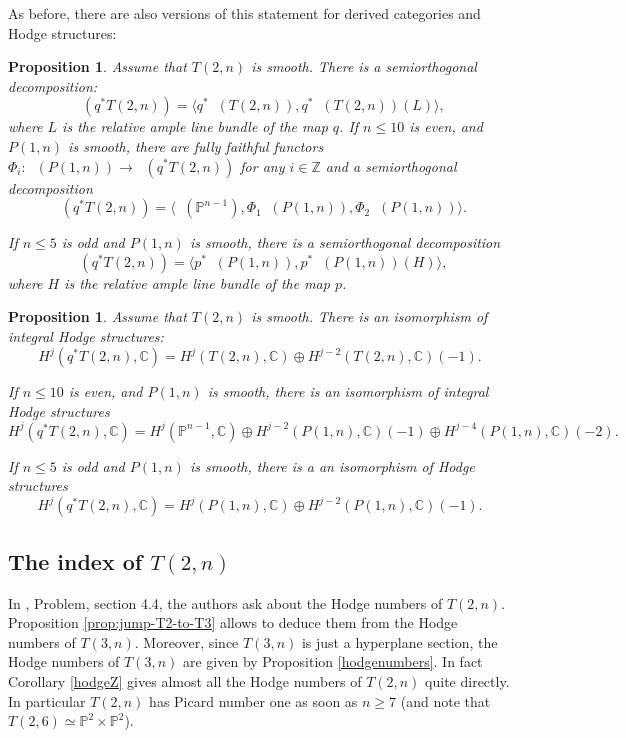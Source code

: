 \documentclass[11pt]{article}
\theoremstyle{plain}
\newtheorem{prop}[theorem]{Proposition}
\theoremstyle{definition}
\newcommand{\cat}[1]{\mathsf{#1}}
\newcommand{\sod}[1]{\langle #1 \rangle}
\DeclareMathOperator{\Db}{{\cat{D}^{\mathrm{b}}}}
\newcommand{\ZZ}{\mathbb{Z}}
\newcommand{\CC}{\mathbb{C}}
\newcommand{\PP}{\mathbb{P}}
\begin{document}
As before, there are also versions of this statement for derived categories and Hodge structures:

\begin{prop}\label{prop:decoforpeski}
Assume that $T(2,n)$ is smooth.
There is a semiorthogonal decomposition:
\begin{equation*}
\Db(q^*T(2,n))=\sod{q^* \Db(T(2,n)),q^*\Db(T(2,n))(L)},
\end{equation*}
where $L$ is the relative ample line bundle of the map $q$.
If $n\le 10$ is even, and $P(1,n)$ is smooth, there are fully faithful functors $\Phi_i:\Db(P(1,n)) \to \Db(q^*T(2,n))$ for any $i \in \ZZ$ and a semiorthogonal decomposition
\begin{equation*}
\Db(q^*T(2,n))=\sod{\Db(\PP^{n-1}),\Phi_1\Db(P(1,n)),\Phi_2\Db(P(1,n))}.
\end{equation*}

If $n\le 5$ is odd and $P(1,n)$ is smooth, there is a semiorthogonal decomposition
\begin{equation*}
\Db(q^*T(2,n))=\sod{p^*\Db(P(1,n)),p^*\Db(P(1,n))(H)},
\end{equation*}
where $H$ is the relative ample line bundle of the map $p$.
\end{prop}

\begin{prop}\label{prop:peski-Hodge}
Assume that $T(2,n)$ is smooth.
There is an isomorphism of integral Hodge structures:
\begin{equation*}
H^j(q^*T(2,n),\CC)= H^j(T(2,n),\CC) \oplus H^{j-2}(T(2,n),\CC)(-1).
\end{equation*}

If $n\le 10$ is even, and $P(1,n)$ is smooth, there is an isomorphism of integral Hodge structures
\[
H^j(q^*T(2,n),\CC)=H^j(\PP^{n-1},\CC) \oplus H^{j-2}(P(1,n),\CC)(-1) \oplus H^{j-4}(P(1,n),\CC)(-2).
\]

If $n\le 5$ is odd and $P(1,n)$ is smooth, there is a an isomorphism of Hodge structures%
\begin{equation*}
H^j(q^*T(2,n),\CC)=H^j(P(1,n),\CC) \oplus H^{j-2}(P(1,n),\CC)(-1).
\end{equation*}
\end{prop}

\subsection{The index of $T(2,n)$}

In \cite{dpfmr}, Problem, section 4.4, the authors ask about the Hodge numbers of $T(2,n)$.
Proposition \ref{prop:jump-T2-to-T3} allows to deduce them from the Hodge numbers of $T(3,n)$.
Moreover, since $T(3,n)$ is just a hyperplane section, the Hodge numbers of $T(3,n)$ are given
by Proposition \ref{hodgenumbers}. In fact Corollary \ref{hodgeZ} gives almost all the Hodge
numbers of $T(2,n)$ quite directly.
In particular $T(2,n)$ has Picard number one as soon as $n\ge 7$ (and note that $T(2,6)\simeq
\PP^2\times\PP^2$).
\end{document}
